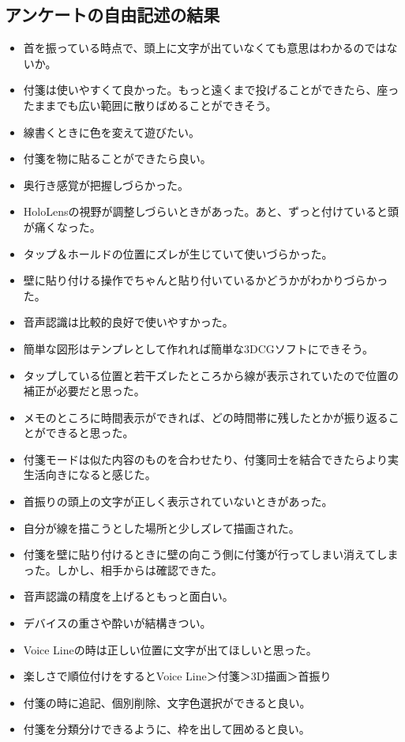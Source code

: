 \documentclass[11pt,a4j, titlepage]{jarticle} %
\begin{document}
\subsection*{アンケートの自由記述の結果}
\begin{itemize}
	\item 首を振っている時点で、頭上に文字が出ていなくても意思はわかるのではないか。
        \item 付箋は使いやすくて良かった。もっと遠くまで投げることができたら、座ったままでも広い範囲に散りばめることができそう。
	\item 線書くときに色を変えて遊びたい。
	\item 付箋を物に貼ることができたら良い。
	\item 奥行き感覚が把握しづらかった。
	\item HoloLensの視野が調整しづらいときがあった。あと、ずっと付けていると頭が痛くなった。
	\item タップ＆ホールドの位置にズレが生じていて使いづらかった。
	\item 壁に貼り付ける操作でちゃんと貼り付いているかどうかがわかりづらかった。
	\item 音声認識は比較的良好で使いやすかった。
	\item 簡単な図形はテンプレとして作れれば簡単な3DCGソフトにできそう。
	\item タップしている位置と若干ズレたところから線が表示されていたので位置の補正が必要だと思った。
	\item メモのところに時間表示ができれば、どの時間帯に残したとかが振り返ることができると思った。
	\item 付箋モードは似た内容のものを合わせたり、付箋同士を結合できたらより実生活向きになると感じた。
	\item 首振りの頭上の文字が正しく表示されていないときがあった。
	\item 自分が線を描こうとした場所と少しズレて描画された。
	\item 付箋を壁に貼り付けるときに壁の向こう側に付箋が行ってしまい消えてしまった。しかし、相手からは確認できた。
	\item 音声認識の精度を上げるともっと面白い。
	\item デバイスの重さや酔いが結構きつい。
	\item Voice Lineの時は正しい位置に文字が出てほしいと思った。
	\item 楽しさで順位付けをするとVoice Line＞付箋＞3D描画＞首振り
	\item 付箋の時に追記、個別削除、文字色選択ができると良い。
	\item 付箋を分類分けできるように、枠を出して囲めると良い。
\end{itemize}
\end{document}

